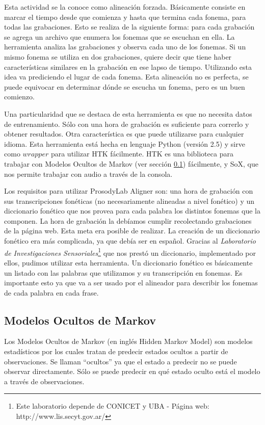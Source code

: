 Esta actividad se la conoce como alineación forzada. Básicamente consiste en marcar el tiempo desde que comienza y hasta que termina cada fonema, para todas las grabaciones. Esto se realiza de la siguiente forma: para cada grabación se agrega un archivo que enumera los fonemas que se escuchan en ella. La herramienta analiza las grabaciones y observa cada uno de los fonemas. Si un mismo fonema se utiliza en dos grabaciones, quiere decir que tiene haber características similares en la grabación en ese lapso de tiempo. Utilizando esta idea va prediciendo el lugar de cada fonema. Esta alineación no es perfecta, se puede equivocar en determinar dónde se escucha un fonema, pero es un buen comienzo.  

Una particularidad que se destaca de esta herramienta es que no necesita datos de entrenamiento. Sólo con una hora de grabación es suficiente para correrlo y obtener resultados. Otra característica es que puede utilizarse para cualquier idioma. Esta herramienta está hecha en lenguaje Python (versión 2.5) y sirve como $wrapper$ para utilizar HTK fácilmente. HTK es una biblioteca para trabajar con Modelos Ocultos de Markov (ver sección \ref{sec:hmm}) fácilmente, y SoX, que nos permite trabajar con audio a través de la consola. 

Los requisitos para utilizar ProsodyLab Aligner son: una hora de grabación con sus transcripciones fonéticas (no necesariamente alineadas a nivel fonético) y un diccionario fonético que nos provea para cada palabra los distintos fonemas que la componen. La hora de grabación la debíamos cumplir recolectando grabaciones de la página web. Esta meta era posible de realizar. La creación de un diccionario fonético era más complicada, ya que debía ser en español. Gracias al \textit{Laboratorio de Investigaciones Sensoriales}\footnote{Este laboratorio depende de CONICET y UBA - Página web: http://www.lis.secyt.gov.ar/} que nos prestó un diccionario, implementado por ellos, pudimos utilizar esta herramienta. Un diccionario fonético es básicamente un listado con las palabras que utilizamos y su transcripción en fonemas. Es importante esto ya que va a ser usado por el alineador para describir los fonemas de cada palabra en cada frase.

\subsection{Modelos Ocultos de Markov}
\label{sec:hmm}
Los Modelos Ocultos de Markov \cite{rabiner} (en inglés Hidden Markov Model) son modelos estadísticos por los cuales tratan de predecir estados ocultos a partir de observaciones. Se llaman ``ocultos'' ya que el estado a predecir no se puede observar directamente. Sólo se puede predecir en qué estado oculto está el modelo a través de observaciones. 

